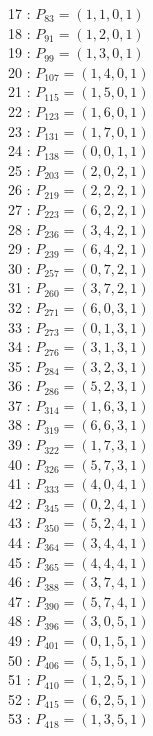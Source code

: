 \documentclass{article}
\begin{document}
{\begin{multicols}{3}
17 : $P_{83}=( 1, 1, 0, 1 )$\\
18 : $P_{91}=( 1, 2, 0, 1 )$\\
19 : $P_{99}=( 1, 3, 0, 1 )$\\
20 : $P_{107}=( 1, 4, 0, 1 )$\\
21 : $P_{115}=( 1, 5, 0, 1 )$\\
22 : $P_{123}=( 1, 6, 0, 1 )$\\
23 : $P_{131}=( 1, 7, 0, 1 )$\\
24 : $P_{138}=( 0, 0, 1, 1 )$\\
25 : $P_{203}=( 2, 0, 2, 1 )$\\
26 : $P_{219}=( 2, 2, 2, 1 )$\\
27 : $P_{223}=( 6, 2, 2, 1 )$\\
28 : $P_{236}=( 3, 4, 2, 1 )$\\
29 : $P_{239}=( 6, 4, 2, 1 )$\\
30 : $P_{257}=( 0, 7, 2, 1 )$\\
31 : $P_{260}=( 3, 7, 2, 1 )$\\
32 : $P_{271}=( 6, 0, 3, 1 )$\\
33 : $P_{273}=( 0, 1, 3, 1 )$\\
34 : $P_{276}=( 3, 1, 3, 1 )$\\
35 : $P_{284}=( 3, 2, 3, 1 )$\\
36 : $P_{286}=( 5, 2, 3, 1 )$\\
37 : $P_{314}=( 1, 6, 3, 1 )$\\
38 : $P_{319}=( 6, 6, 3, 1 )$\\
39 : $P_{322}=( 1, 7, 3, 1 )$\\
40 : $P_{326}=( 5, 7, 3, 1 )$\\
41 : $P_{333}=( 4, 0, 4, 1 )$\\
42 : $P_{345}=( 0, 2, 4, 1 )$\\
43 : $P_{350}=( 5, 2, 4, 1 )$\\
44 : $P_{364}=( 3, 4, 4, 1 )$\\
45 : $P_{365}=( 4, 4, 4, 1 )$\\
46 : $P_{388}=( 3, 7, 4, 1 )$\\
47 : $P_{390}=( 5, 7, 4, 1 )$\\
48 : $P_{396}=( 3, 0, 5, 1 )$\\
49 : $P_{401}=( 0, 1, 5, 1 )$\\
50 : $P_{406}=( 5, 1, 5, 1 )$\\
51 : $P_{410}=( 1, 2, 5, 1 )$\\
52 : $P_{415}=( 6, 2, 5, 1 )$\\
53 : $P_{418}=( 1, 3, 5, 1 )$\\

\end{multicols}}
\end{document}
